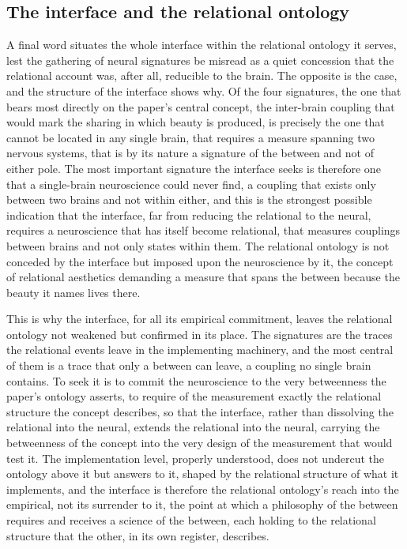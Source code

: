 \subsection{The interface and the relational ontology}
\label{p22:sub:neuro-ontology}

A final word situates the whole interface within the relational ontology it serves, lest the gathering of neural signatures be misread as a quiet concession that the relational account was, after all, reducible to the brain. The opposite is the case, and the structure of the interface shows why. Of the four signatures, the one that bears most directly on the paper's central concept, the inter-brain coupling that would mark the sharing in which beauty is produced, is precisely the one that cannot be located in any single brain, that requires a measure spanning two nervous systems, that is by its nature a signature of the between and not of either pole. The most important signature the interface seeks is therefore one that a single-brain neuroscience could never find, a coupling that exists only between two brains and not within either, and this is the strongest possible indication that the interface, far from reducing the relational to the neural, requires a neuroscience that has itself become relational, that measures couplings between brains and not only states within them. The relational ontology is not conceded by the interface but imposed upon the neuroscience by it, the concept of relational aesthetics demanding a measure that spans the between because the beauty it names lives there.

This is why the interface, for all its empirical commitment, leaves the relational ontology not weakened but confirmed in its place. The signatures are the traces the relational events leave in the implementing machinery, and the most central of them is a trace that only a between can leave, a coupling no single brain contains. To seek it is to commit the neuroscience to the very betweenness the paper's ontology asserts, to require of the measurement exactly the relational structure the concept describes, so that the interface, rather than dissolving the relational into the neural, extends the relational into the neural, carrying the betweenness of the concept into the very design of the measurement that would test it. The implementation level, properly understood, does not undercut the ontology above it but answers to it, shaped by the relational structure of what it implements, and the interface is therefore the relational ontology's reach into the empirical, not its surrender to it, the point at which a philosophy of the between requires and receives a science of the between, each holding to the relational structure that the other, in its own register, describes.
